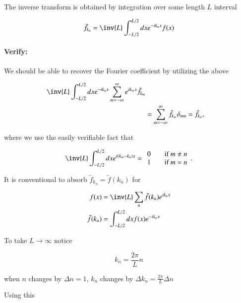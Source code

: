 The inverse transform is obtained by integration over some length $L$ interval

\begin{equation}\label{eqn:relativisticElectrodynamicsL15:310}
\tilde{f}_{k_n} = \inv{L} \int_{-L/2}^{L/2} dx e^{-i k_n x} f(x)
\end{equation}

\paragraph{Verify:}

We should be able to recover the Fourier coefficient by utilizing the above

\begin{align*}
\inv{L} \int_{-L/2}^{L/2} dx e^{-i k_n x} \sum_{m=-\infty}^\infty e^{i k_m x} \tilde{f}_{k_m} \\
&= \sum_{m = -\infty}^\infty \tilde{f}_{k_m} \delta_{mn} = \tilde{f}_{k_n},
\end{align*}

where we use the easily verifiable fact that 

\begin{equation}\label{eqn:relativisticElectrodynamicsL15:800}
\inv{L} \int_{-L/2}^{L/2} dx e^{i (k_m - k_n) x} = 
\begin{array}{l l}
0 & \quad \mbox{if $m \ne n$} \\
1 & \quad \mbox{if $m = n$} \\
\end{array}.
\end{equation}

It is conventional to absorb $\tilde{f}_{k_n} = \tilde{f}(k_n)$ for

\begin{align}\label{eqn:relativisticElectrodynamicsL15:330}
f(x) &= \inv{L} \sum_n \tilde{f}(k_n) e^{i k_n x} \\
\tilde{f}(k_n) &= \int_{-L/2}^{L/2} dx f(x) e^{-i k_n x}
\end{align}

To take $L \rightarrow \infty$ notice

\begin{equation}\label{eqn:relativisticElectrodynamicsL15:350}
k_n = \frac{2 \pi}{L} n
\end{equation}

when $n$ changes by $\Delta n = 1$, $k_n$ changes by $\Delta k_n = \frac{2 \pi}{L} \Delta n$

Using this 


